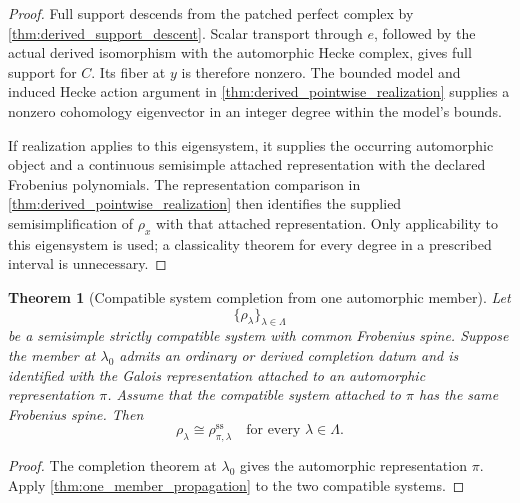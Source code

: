 \documentclass[11pt]{amsart}
\newtheorem{theorem}{Theorem}[section]
\theoremstyle{definition}
\theoremstyle{remark}
\begin{document}
\begin{proof}
Full support descends from the patched perfect complex by \cref{thm:derived_support_descent}. Scalar transport through \(e\), followed by the actual derived isomorphism with the automorphic Hecke complex, gives full support for \(C\). Its fiber at \(y\) is therefore nonzero. The bounded model and induced Hecke action argument in \cref{thm:derived_pointwise_realization} supplies a nonzero cohomology eigenvector in an integer degree within the model's bounds.

If realization applies to this eigensystem, it supplies the occurring automorphic object and a continuous semisimple attached representation with the declared Frobenius polynomials. The representation comparison in \cref{thm:derived_pointwise_realization} then identifies the supplied semisimplification of \(\rho_x\) with that attached representation. Only applicability to this eigensystem is used; a classicality theorem for every degree in a prescribed interval is unnecessary.
\end{proof}

\begin{theorem}[Compatible system completion from one automorphic member]\label{thm:system_completion}
Let
\[
\{\rho_\lambda\}_{\lambda\in\Lambda}
\]
be a semisimple strictly compatible system with common Frobenius spine. Suppose the member at \(\lambda_0\) admits an ordinary or derived completion datum and is identified with the Galois representation attached to an automorphic representation \(\pi\). Assume that the compatible system attached to \(\pi\) has the same Frobenius spine. Then
\[
\boxed{
\rho_\lambda
\cong
\rho_{\pi,\lambda}^{\mathrm{ss}}
\quad
\text{for every }\lambda\in\Lambda.
}
\]
\end{theorem}

\begin{proof}
The completion theorem at \(\lambda_0\) gives the automorphic representation \(\pi\). Apply \cref{thm:one_member_propagation} to the two compatible systems.
\end{proof}
\end{document}
